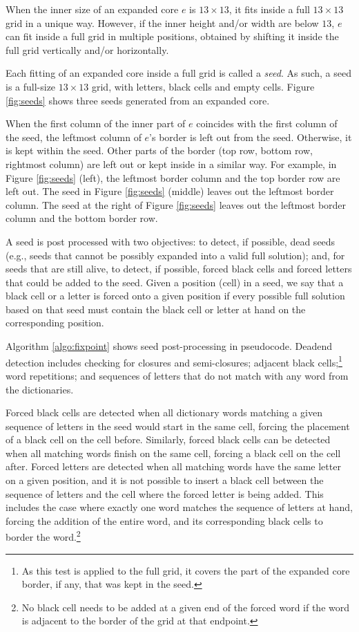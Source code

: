 When the inner size of an expanded core $e$ is $13 \times 13$, it fits inside a full $13 \times 13$ grid in a unique way. However,
if the inner height and/or width are below $13$, $e$ can fit inside a full grid in multiple positions,
obtained by shifting it inside the full grid vertically and/or horizontally.

Each fitting of an expanded core inside a full grid is called a \emph{seed}.
As such, a seed is a full-size $13 \times 13$ grid, with 
letters, black cells and empty cells.
Figure \ref{fig:seeds} shows three seeds generated from an expanded core.

When the first column of the inner part of $e$ coincides 
with the first column of the seed, the leftmost column of $e$'s border
is left out from the seed. 
Otherwise, it is kept within the seed.
Other parts of the border (top row, bottom row, rightmost column)
are left out or kept inside in a similar way.
For example, in Figure \ref{fig:seeds} (left), the leftmost border column 
and the top border row are left out.
The seed in Figure \ref{fig:seeds} (middle) leaves out the
leftmost border column.
The seed at the right of Figure \ref{fig:seeds} leaves out
the leftmost border column and the bottom border row.


A seed is post processed with two objectives: to detect, if possible, dead seeds 
(e.g., seeds that cannot be possibly expanded into a valid full solution); 
and, for seeds that are still alive, to detect, if possible, 
forced black cells and forced letters that could be added to the seed.
Given a position (cell) in a seed,
we say that a black cell or a letter is forced onto a 
given position if 
every possible full solution based on that seed must contain 
the black cell or letter at hand on the corresponding position.

Algorithm \ref{algo:fixpoint} shows seed post-processing in pseudocode.
Deadend detection includes checking for closures and semi-closures;
adjacent black cells;\footnote{As this test is applied to the full
grid, it covers the part of the expanded core border, if any, that was
kept in the seed.}
word repetitions; and
sequences of letters that do not match with any word from the dictionaries.

Forced black cells are detected when all dictionary words matching 
a given sequence of letters in the seed would start in the same cell,
forcing the placement of a black cell on the cell before.
Similarly, forced black cells can be detected when 
all matching words finish on the same cell, forcing a black cell 
on the cell after.
Forced letters are detected when all matching words have the same 
letter on a given position, and it is not possible to insert
a black cell between the sequence of letters and the cell where
the forced letter is being added. 
This includes the case
where exactly one word matches the sequence of letters at hand,
forcing the addition of the entire word, and its corresponding
black cells to border the word.\footnote{No black cell needs to be added
at a given end of the forced word if the word 
is adjacent to the border of the grid at that endpoint.}

